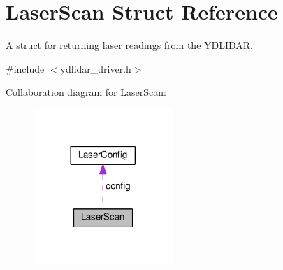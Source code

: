 \hypertarget{struct_laser_scan}{}\section{Laser\+Scan Struct Reference}
\label{struct_laser_scan}


A struct for returning laser readings from the Y\+D\+L\+I\+D\+AR.  




{\ttfamily \#include $<$ydlidar\+\_\+driver.\+h$>$}



Collaboration diagram for Laser\+Scan\+:
\nopagebreak
\begin{figure}[H]
\begin{center}
\leavevmode
\includegraphics[width=149pt]{struct_laser_scan__coll__graph}
\end{center}
\end{figure}

